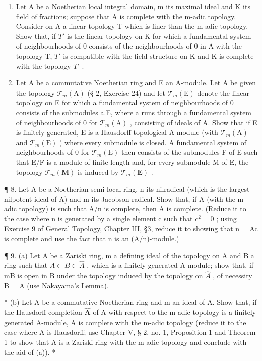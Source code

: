 \begin{enumerate}
\def\labelenumi{\arabic{enumi}.}
\setcounter{enumi}{5}
\item
  Let A be a Noetherian local integral domain, m its maximal ideal and K its field of fractions; suppose that A is complete with the m-adic topology. Consider on A a linear topology T which is finer than the m-adic topology. Show that, if \(T'\) is the linear topology on K for which a fundamental system of neighbourhoods of 0 consists of the neighbourhoods of 0 in A with the topology T, \(T'\) is compatible with the field structure on K and K is complete with the topology \(T'\) .
\item
  Let A be a commutative Noetherian ring and E an A-module. Let A be given the topology \(\mathcal{T}_{m}(\mathrm{A})\) (§ 2, Exercise 24) and let \(\mathcal{T}_{m}(\mathrm{E})\) denote the linear topology on E for which a fundamental system of neighbourhoods of 0 consists of the submodules a.E, where a runs through a fundamental system of neighbourhoods of 0 for \(\mathcal{T}_{m}(\mathrm{A})\) , consisting of ideals of A. Show that if E is finitely generated, E is a Hausdorff topological A-module (with \(\mathcal{T}_{m}(\mathrm{A})\) and \(\mathcal{T}_{m}(\mathrm{E})\) ) where every submodule is closed. A fundamental system of neighbourhoods of 0 for \(\mathcal{T}_{m}(\mathrm{E})\) then consists of the submodules F of E such that E/F is a module of finite length and, for every submodule M of E, the topology \(\mathcal{T}_{m}(\mathbf{M})\) is induced by \(\mathcal{T}_{m}(\mathbf{E})\) .
\end{enumerate}

¶ 8. Let A be a Noetherian semi-local ring, n its nilradical (which is the largest nilpotent ideal of A) and m its Jacobson radical. Show that, if A (with the m-adic topology) is such that A/n is complete, then A is complete. (Reduce it to the case where n is generated by a single element c such that \(c^{2} = 0\) ; using Exercise 9 of General Topology, Chapter III, §3, reduce it to showing that n = Ac is complete and use the fact that n is an (A/n)-module.)

¶ 9. (a) Let A be a Zariski ring, m a defining ideal of the topology on A and B a ring such that \(A \subset B \subset \hat{A}\) , which is a finitely generated A-module; show that, if mB is open in B under the topology induced by the topology on \(\hat{A}\) , of necessity B = A (use Nakayama's Lemma).

* (b) Let A be a commutative Noetherian ring and m an ideal of A. Show that, if the Hausdorff completion \(\hat{\mathbf{A}}\) of A with respect to the m-adic topology is a finitely generated A-module, A is complete with the m-adic topology (reduce it to the case where A is Hausdorff; use Chapter V, § 2, no. 1, Proposition 1 and Theorem 1 to show that A is a Zariski ring with the m-adic topology and conclude with the aid of (a)). *

